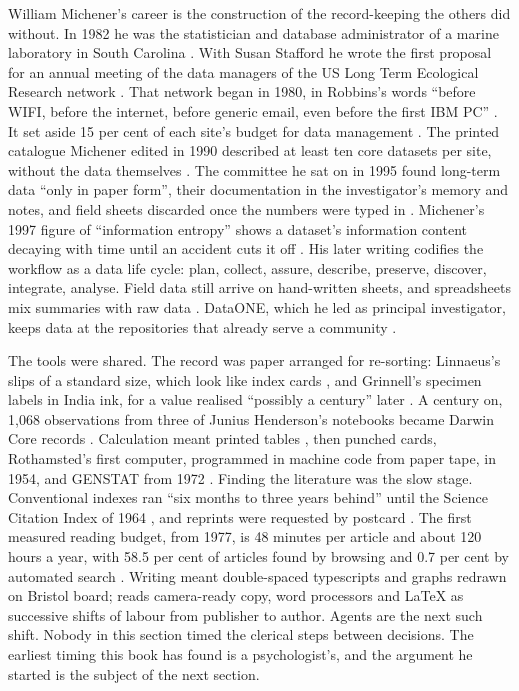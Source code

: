William Michener's career is the construction of the record-keeping the others
did without. In 1982 he was the statistician and database administrator of a
marine laboratory in South Carolina \parencite{michener2019cv}. With Susan
Stafford he wrote the first proposal for an annual meeting of the data managers
of the US Long Term Ecological Research network
\parencite{stafford2021lterretrospective}. That network began in 1980, in
Robbins's words ``before WIFI, before the internet, before generic email, even
before the first IBM PC'' \parencite{robbins2011lterdata}. It set aside 15 per
cent of each site's budget for data management
\parencite{stafford2021lterretrospective}. The printed catalogue Michener
edited in 1990 described at least ten core datasets per site, without the data
themselves \parencite{porter2010datasharing}. The committee he sat on in 1995
found long-term data ``only in paper form'', their documentation in the
investigator's memory and notes, and field sheets discarded once the numbers
were typed in \parencite{gross1995fled}. Michener's 1997 figure of
``information entropy'' shows a dataset's information content decaying with
time until an accident cuts it off \parencite{robbins2011lterdata}. His later
writing codifies the workflow as a data life cycle: plan, collect, assure,
describe, preserve, discover, integrate, analyse. Field data still arrive on
hand-written sheets, and spreadsheets mix summaries with raw data
\parencite{michener2012ecoinformatics}. DataONE, which he led as principal
investigator, keeps data at the repositories that already serve a community
\parencite{michener2011dataone}.

The tools were shared. The record was paper arranged for re-sorting: Linnaeus's
slips of a standard size, which look like index cards
\parencite{charmantier2014paperslips}, and Grinnell's specimen labels in India
ink, for a value realised ``possibly a century'' later
\parencite{grinnell1910researchmuseum}. A century on, 1,068 observations from
three of Junius Henderson's notebooks became Darwin Core records
\parencite{thomer2012fieldnotebooks}. Calculation meant printed tables
\parencite{pearson1914tables}, then punched cards, Rothamsted's first computer,
programmed in machine code from paper tape, in 1954, and GENSTAT from 1972
\parencite{gower2015rothamstedcomputing}. Finding the literature was the slow
stage. Conventional indexes ran ``six months to three years behind'' until the
Science Citation Index of 1964 \parencite{garfield2007evolution}, and reprints
were requested by postcard \parencite{sarli2019reprint}. The first measured
reading budget, from 1977, is 48 minutes per article and about 120 hours a
year, with 58.5 per cent of articles found by browsing and 0.7 per cent by
automated search \parencite{tenopir2008reading}. Writing meant double-spaced
typescripts and graphs redrawn on Bristol board; \textcite{fyfe2026authorship}
reads camera-ready copy, word processors and \LaTeX{} as successive shifts of
labour from publisher to author. Agents are the next such shift. Nobody in this
section timed the clerical steps between decisions. The earliest timing this
book has found is a psychologist's, and the argument he started is the subject
of the next section.

